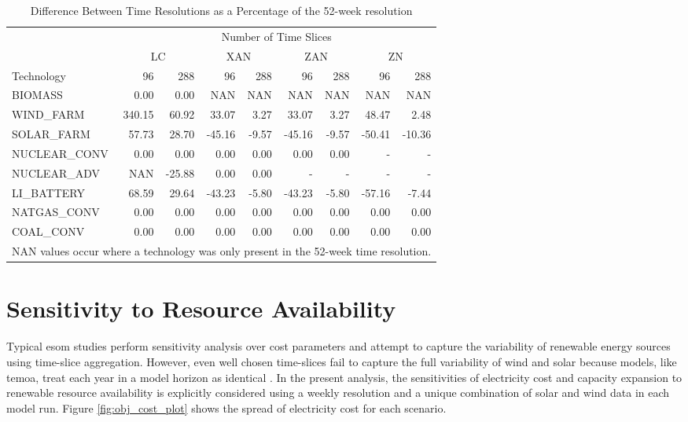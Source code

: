 \begin{table}[H]
  \centering
  \caption{Difference Between Time Resolutions as a Percentage of the 52-week resolution}
  \label{tab:relative_error}
\begin{tabular}{lrr|rr|rr|rr}
  \toprule
    & \multicolumn{8}{c}{Number of Time Slices}\\
    & \multicolumn{2}{c}{LC} & \multicolumn{2}{c}{XAN} & \multicolumn{2}{c}{ZAN} & \multicolumn{2}{c}{ZN}\\
    Technology & 96 & 288 & 96 & 288 & 96 & 288 & 96 & 288\\
    \midrule
    BIOMASS &0.00&0.00&NAN&NAN&NAN&NAN& NAN & NAN\\
    WIND\_FARM &340.15&60.92&33.07&3.27&33.07&3.27& 48.47 & 2.48\\
    SOLAR\_FARM &57.73&28.70&-45.16&-9.57&-45.16&-9.57& -50.41 & -10.36\\
    NUCLEAR\_CONV &0.00&0.00&0.00&0.00&0.00&0.00& - & -\\
    NUCLEAR\_ADV &NAN&-25.88&0.00&0.00&-&-& - & - \\
    LI\_BATTERY &68.59&29.64&-43.23&-5.80&-43.23&-5.80&-57.16&-7.44\\
    NATGAS\_CONV &0.00&0.00&0.00&0.00&0.00&0.00&0.00&0.00\\
    COAL\_CONV &0.00&0.00&0.00&0.00&0.00&0.00&0.00&0.00\\
    \bottomrule
    \multicolumn{9}{p{12.25cm}}{\small{NAN values occur where a technology was only present in the 52-week time resolution.}}
  \end{tabular}
\end{table}

\section{Sensitivity to Resource Availability}

Typical \gls{esom} studies perform sensitivity analysis over cost parameters and
attempt to capture the variability of renewable energy sources using time-slice
aggregation. However, even well chosen time-slices fail to capture the full variability
of wind and solar because models, like \gls{temoa}, treat each year in a model
horizon as identical \cite{hunter_modeling_2013}. In the present analysis, the
sensitivities of electricity cost and capacity expansion to renewable resource
availability is explicitly considered using a weekly resolution and a unique combination
of solar and wind data in each model run. Figure \ref{fig:obj_cost_plot} shows
the spread of electricity cost for each scenario.

